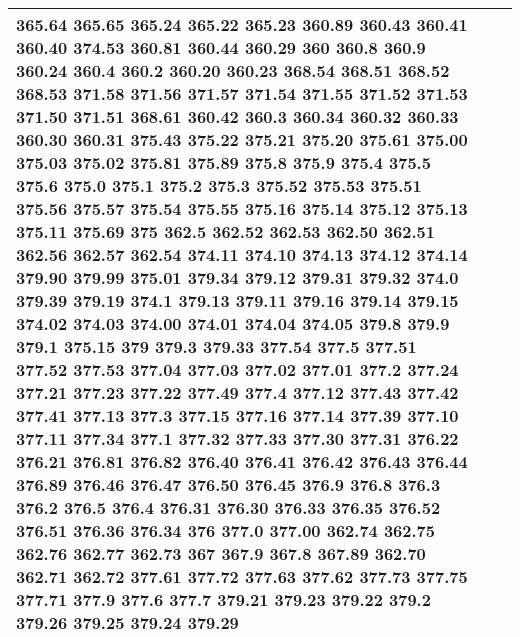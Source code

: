 \begin{longtable}{|R{.05in}|L{.65in}||L{5.65in}|}
365.64 365.65 365.24 365.22 365.23 360.89 360.43 360.41 360.40 374.53 360.81 360.44 360.29 360 360.8 360.9 360.24 360.4 360.2 360.20 360.23 368.54 368.51 368.52 368.53 371.58 371.56 371.57 371.54 371.55 371.52 371.53 371.50 371.51 368.61 360.42 360.3 360.34 360.32 360.33 360.30 360.31 375.43 375.22 375.21 375.20 375.61 375.00 375.03 375.02 375.81 375.89 375.8 375.9 375.4 375.5 375.6 375.0 375.1 375.2 375.3 375.52 375.53 375.51 375.56 375.57 375.54 375.55 375.16 375.14 375.12 375.13 375.11 375.69 375 362.5 362.52 362.53 362.50 362.51 362.56 362.57 362.54 374.11 374.10 374.13 374.12 374.14 379.90 379.99 375.01 379.34 379.12 379.31 379.32 374.0 379.39 379.19 374.1 379.13 379.11 379.16 379.14 379.15 374.02 374.03 374.00 374.01 374.04 374.05 379.8 379.9 379.1 375.15 379 379.3 379.33 377.54 377.5 377.51 377.52 377.53 377.04 377.03 377.02 377.01 377.2 377.24 377.21 377.23 377.22 377.49 377.4 377.12 377.43 377.42 377.41 377.13 377.3 377.15 377.16 377.14 377.39 377.10 377.11 377.34 377.1 377.32 377.33 377.30 377.31 376.22 376.21 376.81 376.82 376.40 376.41 376.42 376.43 376.44 376.89 376.46 376.47 376.50 376.45 376.9 376.8 376.3 376.2 376.5 376.4 376.31 376.30 376.33 376.35 376.52 376.51 376.36 376.34 376 377.0 377.00 362.74 362.75 362.76 362.77 362.73 367 367.9 367.8 367.89 362.70 362.71 362.72 377.61 377.72 377.63 377.62 377.73 377.75 377.71 377.9 377.6 377.7 379.21 379.23 379.22 379.2 379.26 379.25 379.24 379.29\\\hline

\end{longtable}

